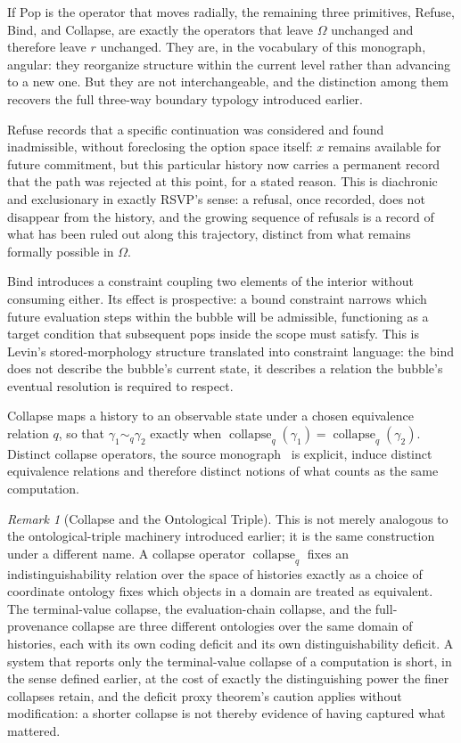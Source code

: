 \documentclass[11pt,fleqn]{book}
\numberwithin{equation}{chapter}
\theoremstyle{plain}
\theoremstyle{definition}
\theoremstyle{remark}
\newtheorem{remark}[theorem]{Remark}
\providecommand{\scollapse}[1]{\operatorname{collapse}_{#1}}
\begin{document}
If Pop is the operator that moves radially, the remaining three primitives, Refuse, Bind, and Collapse, are exactly the operators that leave \(\Omega\) unchanged and therefore leave \(r\) unchanged. They are, in the vocabulary of this monograph, angular: they reorganize structure within the current level rather than advancing to a new one. But they are not interchangeable, and the distinction among them recovers the full three-way boundary typology introduced earlier.

Refuse records that a specific continuation was considered and found inadmissible, without foreclosing the option space itself: \(x\) remains available for future commitment, but this particular history now carries a permanent record that the path was rejected at this point, for a stated reason. This is diachronic and exclusionary in exactly RSVP's sense: a refusal, once recorded, does not disappear from the history, and the growing sequence of refusals is a record of what has been ruled out along this trajectory, distinct from what remains formally possible in \(\Omega\).

Bind introduces a constraint coupling two elements of the interior without consuming either. Its effect is prospective: a bound constraint narrows which future evaluation steps within the bubble will be admissible, functioning as a target condition that subsequent pops inside the scope must satisfy. This is Levin's stored-morphology structure translated into constraint language: the bind does not describe the bubble's current state, it describes a relation the bubble's eventual resolution is required to respect.

Collapse maps a history to an observable state under a chosen equivalence relation \(q\), so that \(\gamma_1\sim_q\gamma_2\) exactly when \(\scollapse{q}(\gamma_1)=\scollapse{q}(\gamma_2)\). Distinct collapse operators, the source monograph~\cite{spherepop-histories} is explicit, induce distinct equivalence relations and therefore distinct notions of what counts as the same computation.

\begin{remark}[Collapse and the Ontological Triple]
This is not merely analogous to the ontological-triple machinery introduced earlier; it is the same construction under a different name. A collapse operator \(\scollapse{q}\) fixes an indistinguishability relation over the space of histories exactly as a choice of coordinate ontology fixes which objects in a domain are treated as equivalent. The terminal-value collapse, the evaluation-chain collapse, and the full-provenance collapse are three different ontologies over the same domain of histories, each with its own coding deficit and its own distinguishability deficit. A system that reports only the terminal-value collapse of a computation is short, in the sense defined earlier, at the cost of exactly the distinguishing power the finer collapses retain, and the deficit proxy theorem's caution applies without modification: a shorter collapse is not thereby evidence of having captured what mattered.
\end{remark}
\end{document}
